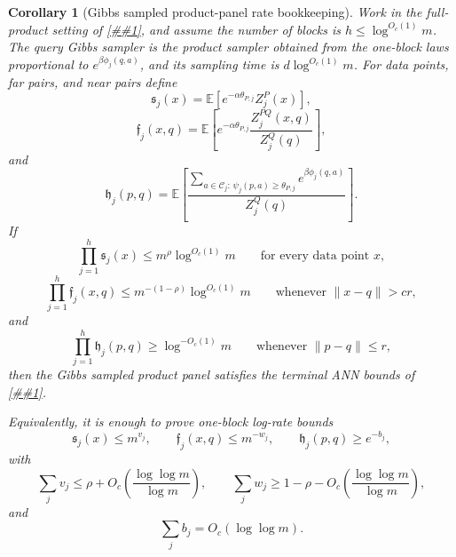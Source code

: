 \documentclass[10pt]{article}
\newcommand{\cref}[1]{\ref{##1}}
\newtheorem{corollary}[theorem]{Corollary}
\theoremstyle{definition}
\newcommand{\E}{\mathbb{E}}
\begin{document}
\begin{corollary}[Gibbs sampled product-panel rate bookkeeping]
   \label{cor:gibbs-sampled-rate-bookkeeping}
   Work in the full-product setting of
   \cref{cor:gibbs-sampled-product-panel}, and assume the number of blocks is
   \(h\le\log^{O_c(1)}m\).  The query Gibbs sampler is the product sampler
   obtained from the one-block laws proportional to
   \(e^{\beta\phi_j(q,a)}\), and its sampling time is
   \(d\log^{O_c(1)}m\).  For data points, far pairs, and near pairs define
   \[
      \mathfrak s_j(x)=
      \E\!\left[e^{-\alpha\theta_{P,j}}Z_j^P(x)\right],
   \]
   \[
      \mathfrak f_j(x,q)=
      \E\!\left[
         e^{-\alpha\theta_{P,j}}
         \frac{Z_j^{PQ}(x,q)}{Z_j^Q(q)}
      \right],
   \]
   and
   \[
      \mathfrak h_j(p,q)=
      \E\!\left[
      \frac{
         \sum_{a\in\mathcal C_j:\,\psi_j(p,a)\ge\theta_{P,j}}
         e^{\beta\phi_j(q,a)}
      }{Z_j^Q(q)}
      \right].
   \]
   If
   \[
      \prod_{j=1}^h\mathfrak s_j(x)
      \le m^\rho\log^{O_c(1)}m
      \qquad\text{for every data point }x,
      \tag{GR1}
   \]
   \[
      \prod_{j=1}^h\mathfrak f_j(x,q)
      \le m^{-(1-\rho)}\log^{O_c(1)}m
      \qquad
      \text{whenever }\|x-q\|>cr,
      \tag{GR2}
   \]
   and
   \[
      \prod_{j=1}^h\mathfrak h_j(p,q)
      \ge \log^{-O_c(1)}m
      \qquad
      \text{whenever }\|p-q\|\le r,
      \tag{GR3}
   \]
   then the Gibbs sampled product panel satisfies the terminal ANN bounds of
   \cref{prop:sampled-structured-panel}.

   Equivalently, it is enough to prove one-block log-rate bounds
   \[
      \mathfrak s_j(x)\le m^{v_j},\qquad
      \mathfrak f_j(x,q)\le m^{-w_j},\qquad
      \mathfrak h_j(p,q)\ge e^{-b_j},
   \]
   with
   \[
      \sum_jv_j\le\rho+O_c\!\left(\frac{\log\log m}{\log m}\right),
      \qquad
      \sum_jw_j\ge1-\rho-O_c\!\left(\frac{\log\log m}{\log m}\right),
   \]
   and
   \[
      \sum_jb_j=O_c(\log\log m).
   \]
\end{corollary}
\end{document}
